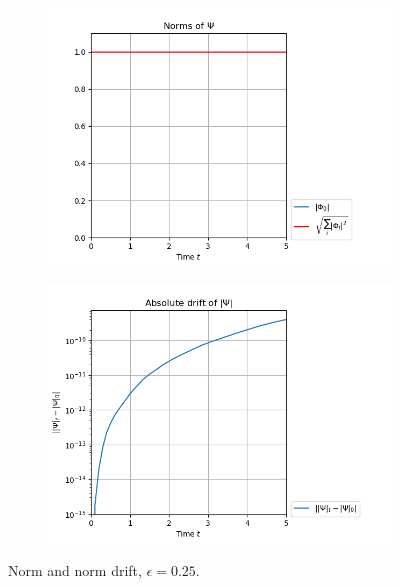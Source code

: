 \documentclass[11pt, a4paper, oneside]{article}
\begin{document}
\begin{figure}[h]
  \begin{subfigure}[b]{0.45 \textwidth}
    \includegraphics[width = \textwidth]{graphics/threefold_morse/norms_block0.PNG}
  \end{subfigure}
  \hfill
  \begin{subfigure}[b]{0.45 \textwidth}
    \includegraphics[width = \textwidth]{graphics/threefold_morse/norms_drift_block0_log.PNG}
  \end{subfigure}
  \caption{Norm and norm drift, $\epsilon = 0.25$.}
  \label{fig:threefold_norm}
\end{figure}
\end{document}
